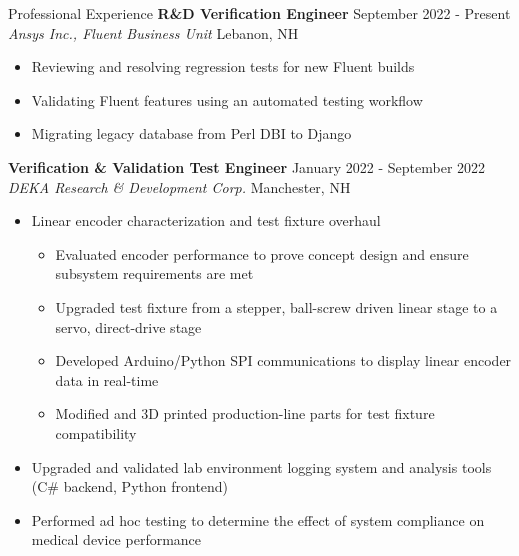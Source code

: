 \documentclass{resume}
\begin{document}
\begin{rSection}{Professional Experience}
    {\bf R\&D Verification Engineer} \hfill {September 2022 - Present}
    \\{\em Ansys Inc., Fluent Business Unit} \hfill {Lebanon, NH}
    \vspace{-0.5em}
    \begin{itemize}[label={\tiny\raisebox{1ex}{\textbullet}}, noitemsep]
        \item Reviewing and resolving regression tests for new Fluent builds
        \item Validating Fluent features using an automated testing workflow
        \item Migrating legacy database from Perl DBI to Django
    \end{itemize}
    \vspace{-0.4em}
    {\bf Verification \& Validation Test Engineer} \hfill {January 2022 - September 2022}
    \\{\em DEKA Research \& Development Corp.} \hfill {Manchester, NH}
    \vspace{-0.5em}
    \begin{itemize}[label={\tiny\raisebox{1ex}{\textbullet}}, noitemsep]
        \item Linear encoder characterization and test fixture overhaul
              \begin{itemize}[label={\tiny\raisebox{1ex}{\textbullet}}, noitemsep]
                  \item Evaluated encoder performance to prove concept design and ensure subsystem requirements are met
                  \item Upgraded test fixture from a stepper, ball-screw driven linear stage to a servo, direct-drive stage
                  \item Developed Arduino/Python SPI communications to display linear encoder data in real-time
                  \item Modified and 3D printed production-line parts for test fixture compatibility
              \end{itemize}
        \item Upgraded and validated lab environment logging system and analysis tools (C\# backend, Python frontend)
        \item Performed ad hoc testing to determine the effect of system compliance on medical device performance
    \end{itemize}
    \vspace{-0.4em}

\end{rSection}
\end{document}
